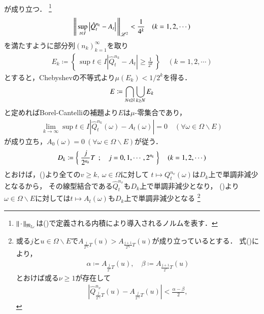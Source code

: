 \begin{prf}
\begin{description}
\begin{align}
				\end{align}
				が成り立つ．
				\footnote{
					$\left\|\, \cdot\, \right\|_{\mathfrak{M}_{2,c}}$は()で定義される内積により導入されるノルムを表す．
				}
				\begin{align}
					\left\|\, \operatorname*{sup}_{t \in I} \left| \hat{Q}_t^{n_k} - A_t \right|\, \right\|_{\mathscr{L}^2} < \frac{1}{4^k} \quad (k=1,2,\cdots)
				\end{align}
				を満たすように部分列$(n_k)_{k=1}^{\infty}$を取り
				\begin{align}
					E_k \coloneqq \left\{\, \sup{t \in I}{\left| \hat{Q}_t^{n_k} - A_t \right|} \geq \frac{1}{2^k} \, \right\} \quad (k=1,2,\cdots)
				\end{align}
				とすると，Chebyshevの不等式より$\mu(E_k) < 1/2^k$を得る．
				\begin{align}
					E \coloneqq \bigcap_{N \in \mathbb{N}} \bigcup_{k \geq N} E_k
				\end{align}
				と定めればBorel-Cantelliの補題より$E$は$\mu$-零集合であり，
				\begin{align}
					\lim_{k \to \infty}\sup{t \in I}{\left| \hat{Q}_t^{n_k}(\omega) - A_t(\omega) \right|} = 0 
					\quad (\forall \omega \in \Omega \backslash E)
					\label{eq:thm_quadratic_variation_1}
				\end{align}
				が成り立ち，$A_0(\omega) = 0 \ (\forall \omega \in \Omega \backslash E)$が従う．
				\begin{align}
					D_k \coloneqq \left\{\ \frac{j}{2^{n_k}}T\ \, ; \quad  j = 0,1,\cdots,2^{n_k} \ \right\} \quad (k=1,2,\cdots)
				\end{align}
				とおけば，()より全ての$v \geq k,\ \omega \in \Omega$に対して
				$t \longmapsto Q_t^{n_v}(\omega)$は$D_k$上で単調非減少となるから，
				その線型結合である$\hat{Q}_t^{n_v}$も$D_k$上で単調非減少となり，
				()より
				$\omega \in \Omega \backslash E$に対しては$t \longmapsto A_t(\omega)$も$D_k$上で単調非減少となる
				\footnote{
					或る$j$と$u \in \Omega \backslash E$で$A_{\frac{j}{2^{n_k}}T}(u) > A_{\frac{j+1}{2^{n_k}}T}(u)$が成り立っているとする．
					式()により，
					\begin{align}
						\alpha \coloneqq A_{\frac{j}{2^n}T}(u),
						\quad \beta \coloneqq A_{\frac{j+1}{2^n}T}(u)
					\end{align}
					とおけば或る$\nu \geq 1$が存在して
					\begin{align}
						\left| \hat{Q}_{\frac{j}{2^{n_k}}T}^{n_\nu}(u) - A_{\frac{j}{2^{n_k}}T}(u) \right| < \frac{\alpha - \beta}{2},

\end{align}}
\end{description}
\end{prf}
